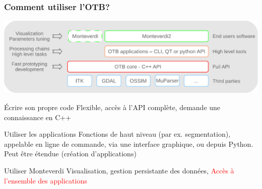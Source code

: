\documentclass[8pt]{beamer}
\begin{document}
\begin{frame}
\frametitle{Comment utiliser l'OTB?}
\vspace{-0.5cm}
\begin{center}
\includegraphics[width=\textwidth]{images/sandwich.pdf}
\end{center}
\vspace{-0.5cm}
\begin{block}{Écrire son propre code}
 Flexible, accès à l'API complète, demande une connaissance en C++
\end{block}
\begin{block}{Utiliser les applications}
 Fonctions de haut niveau (par ex. segmentation), appelable en ligne de commande, via une interface graphique, ou depuis Python. Peut être étendue (création d'applications)
\end{block}
\begin{block}{Utiliser Monteverdi}
Visualisation, gestion persistante des données, \textcolor{red}{Accès à l'ensemble des applications}
\end{block}
\end{frame}
\end{document}
